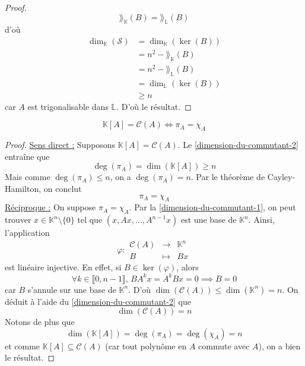 \begin{proof}
    \[ \rang_{\mathbb{K}}(B) = \rang_{\mathbb{L}}(B) \]
    d'où
    \begin{align*}
      \dim_{\mathbb{K}}(\mathcal{S}) &= \dim_{\mathbb{K}}(\ker(B)) \\
      &= n^2 - \rang_{\mathbb{K}}(B) \\
      &= n^2 - \rang_{\mathbb{L}}(B) \\
      &= \dim_{\mathbb{L}}(\ker(B)) \\
      &\geq n
    \end{align*}
    car $A$ est trigonalisable dans $\mathbb{L}$. D'où le résultat.
  \end{proof}

  \begin{theorem}
    \[ \mathbb{K}[A] = \mathcal{C}(A) \iff \pi_A = \chi_A \]
  \end{theorem}

  \begin{proof}
    \uline{Sens direct :} Supposons $\mathbb{K}[A] = \mathcal{C}(A)$. Le \cref{dimension-du-commutant-2} entraîne que
    \[ \deg(\pi_A) = \dim(\mathbb{K}[A]) \geq n \]
    Mais comme $\deg(\pi_A) \leq n$, on a $\deg(\pi_A) = n$. Par le théorème de Cayley-Hamilton, on conclut
    \[ \pi_A = \chi_A \]
    \uline{Réciproque :} On suppose $\pi_A = \chi_A$. Par la \cref{dimension-du-commutant-1}, on peut trouver $x \in \mathbb{K}^n \setminus \{ 0 \}$ tel que $(x, Ax, \dots, A^{n-1}x)$ est une base de $\mathbb{K}^n$. Ainsi, l'application
    \[ \varphi :
    \begin{array}{ccc}
      \mathcal{C}(A) &\rightarrow& \mathbb{K}^n \\
      B &\mapsto& Bx
    \end{array}
    \]
    est linéaire injective. En effet, si $B \in \ker(\varphi)$, alors
    \[ \forall k \in \llbracket 0, n-1 \rrbracket, \, BA^kx = A^kBx = 0 \implies B = 0 \]
    car $B$ s'annule sur une base de $\mathbb{K}^n$. D'où $\dim(\mathcal{C}(A)) \leq \dim(\mathbb{K}^n) = n$. On déduit à l'aide du \cref{dimension-du-commutant-2} que
    \[ \dim(\mathcal{C}(A)) = n \]
    Notons de plus que
    \[ \dim(\mathbb{K}[A]) = \deg(\pi_A) = \deg(\chi_A) = n \]
    et comme $\mathbb{K}[A] \subseteq \mathcal{C}(A)$ (car tout polynôme en $A$ commute avec $A$), on a bien le résultat.
  \end{proof}

